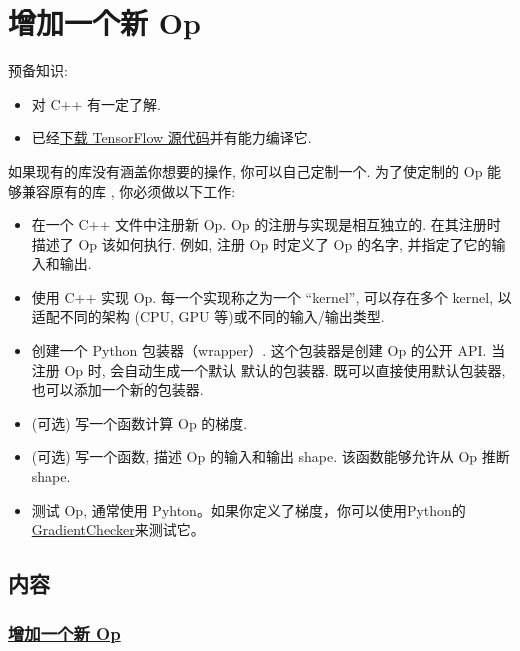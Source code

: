 

\section{增加一个新 Op }\label{ux589eux52a0ux4e00ux4e2aux65b0-op}

预备知识:

\begin{itemize}
\tightlist
\item
  对 C++ 有一定了解.
\item
  已经\href{tensorflow-zh/SOURCE/get_started/introduction.md\#source}{下载
  TensorFlow 源代码}并有能力编译它.
\end{itemize}

如果现有的库没有涵盖你想要的操作, 你可以自己定制一个. 为了使定制的 Op
能够兼容原有的库 , 你必须做以下工作:

\begin{itemize}
\tightlist
\item
  在一个 C++ 文件中注册新 Op. Op 的注册与实现是相互独立的.
  在其注册时描述了 Op 该如何执行. 例如, 注册 Op 时定义了 Op 的名字,
  并指定了它的输入和输出.
\item
  使用 C++ 实现 Op. 每一个实现称之为一个 ``kernel'', 可以存在多个
  kernel, 以适配不同的架构 (CPU, GPU 等)或不同的输入/输出类型.
\item
  创建一个 Python 包装器（wrapper）. 这个包装器是创建 Op 的公开 API.
  当注册 Op 时, 会自动生成一个默认 默认的包装器.
  既可以直接使用默认包装器, 也可以添加一个新的包装器.
\item
  (可选) 写一个函数计算 Op 的梯度.
\item
  (可选) 写一个函数, 描述 Op 的输入和输出 shape. 该函数能够允许从 Op
  推断 shape.
\item
  测试 Op, 通常使用
  Pyhton。如果你定义了梯度，你可以使用Python的\href{https://tensorflow.googlesource.com/tensorflow/+/master/tensorflow/python/kernel_tests/gradient_checker.py}{GradientChecker}来测试它。
\end{itemize}

\subsection{内容}\label{ux5185ux5bb9}

\subsubsection{\texorpdfstring{\protect\hyperlink{AUTOGENERATED-adding-a-new-op}{增加一个新
Op}}{增加一个新 Op}}\label{ux589eux52a0ux4e00ux4e2aux65b0-op-1}

